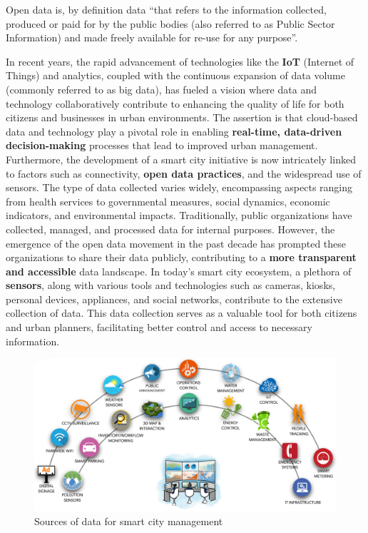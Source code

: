 Open data is, by definition \cite{dataEuropa} data ``that refers to the information collected, produced or paid for by the public bodies (also referred to as Public Sector Information) and made freely available for re-use for any purpose''.

In recent years, the rapid advancement of technologies like the \textbf{IoT} (Internet of Things) and analytics, coupled with the continuous expansion of data volume (commonly referred to as big data), has fueled a vision where data and technology collaboratively contribute to enhancing the quality of life for both citizens and businesses in urban environments. The assertion is that cloud-based data and technology play a pivotal role in enabling \textbf{real-time, data-driven decision-making} processes that lead to improved urban management. Furthermore, the development of a smart city initiative is now intricately linked to factors such as connectivity, \textbf{open data practices}, and the widespread use of sensors. The type of data collected varies widely, encompassing aspects ranging from health services to governmental measures, social dynamics, economic indicators, and environmental impacts. Traditionally, public organizations have collected, managed, and processed data for internal purposes. However, the emergence of the open data movement in the past decade has prompted these organizations to share their data publicly, contributing to a \textbf{more transparent and accessible} data landscape.
In today's smart city ecosystem, a plethora of \textbf{sensors}, along with various tools and technologies such as cameras, kiosks, personal devices, appliances, and social networks, contribute to the extensive collection of data. This data collection serves as a valuable tool for both citizens and urban planners, facilitating better control and access to necessary information.
\begin{figure}
\centering
\includegraphics[width=0.9\columnwidth]{images/SmartCity.png}
\caption{Sources of data for smart city management \cite{figureSourcesofData}}
\end{figure}
